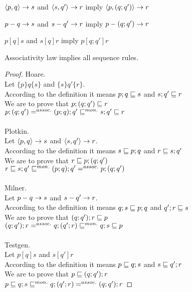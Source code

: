 \documentclass{article}
\begin{document}
\begin{rul}
$\left< p, q \right> \rightarrow s$ and $\left< s, q' \right> \rightarrow r$ imply $\left< p, (q; q') \right> \rightarrow r$
\end{rul}

\begin{rul}
$p-q\rightarrow s$ and $s-q'\rightarrow r$ imply $p-(q; q')\rightarrow r$
\end{rul}

\begin{rul}
$p [q] s$ and $s [q] r$ imply $p [q; q'] r$
\end{rul}

\begin{theorem}
Associativity law implies all sequence rules.
\end{theorem}

\begin{proof}
Hoare.\\
Let $\{p\}q\{s\}$ and $\{s\}q'\{r\}$.\\
According to the definition it means $p; q \sqsubseteq s$ and $s; q' \sqsubseteq r$\\
We are to prove that $p; (q; q') \sqsubseteq r$\\
$p; (q; q') =^{assoc.} (p; q); q' \sqsubseteq^{mon.} s; q' \sqsubseteq r$\\
\\
Plotkin.\\
Let $\left< p, q \right> \rightarrow s$ and $\left< s, q' \right> \rightarrow r$.\\
According to the definition it means $s \sqsubseteq p; q$ and $r \sqsubseteq s; q'$\\
We are to prove that $r \sqsubseteq p; (q; q')$\\
$r \sqsubseteq s; q' \sqsubseteq^{mon.} (p; q); q' =^{assoc.} p; (q; q')$\\
\\
Milner.\\
Let $p-q\rightarrow s$ and $s-q'\rightarrow r$.\\
According to the definition it means $q; s \sqsubseteq p; q$ and $q'; r \sqsubseteq s$\\
We are to prove that $(q; q'); r \sqsubseteq p$\\
$(q; q'); r =^{assoc.} q; (q'; r) \sqsubseteq^{mon.} q; s \sqsubseteq p$\\
\\
Testgen.\\
Let $p [q] s$ and $s [q'] r$\\
According to the definition it means $p \sqsubseteq q; s$ and $s \sqsubseteq q'; r$\\
We are to prove that $p \sqsubseteq (q; q'); r$\\
$p \sqsubseteq q; s \sqsubseteq^{mon.} q; (q'; r) =^{assoc.} (q; q'); r$
\end{proof}
\end{document}
